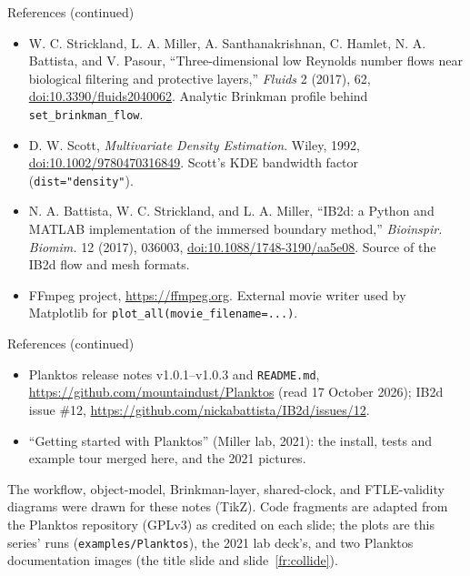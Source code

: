 \documentclass[aspectratio=169,11pt]{beamer}
\begin{document}
\begin{frame}{References (continued)}
\footnotesize
\begin{itemize}\itemsep3pt
  \item W. C. Strickland, L. A. Miller, A. Santhanakrishnan, C. Hamlet, N. A. Battista, and V. Pasour, ``Three-dimensional low Reynolds number flows near biological filtering and protective layers,'' \emph{Fluids} 2 (2017), 62, \href{https://doi.org/10.3390/fluids2040062}{doi:10.3390/fluids2040062}. Analytic Brinkman profile behind \texttt{set\_brinkman\_flow}.
  \item D. W. Scott, \emph{Multivariate Density Estimation}. Wiley, 1992, \href{https://doi.org/10.1002/9780470316849}{doi:10.1002/9780470316849}. Scott's KDE bandwidth factor (\texttt{dist="density"}).
  \item N. A. Battista, W. C. Strickland, and L. A. Miller, ``IB2d: a Python and MATLAB implementation of the immersed boundary method,'' \emph{Bioinspir. Biomim.} 12 (2017), 036003, \href{https://doi.org/10.1088/1748-3190/aa5e08}{doi:10.1088/1748-3190/aa5e08}. Source of the IB2d flow and mesh formats.
  \item FFmpeg project, \url{https://ffmpeg.org}. External movie writer used by Matplotlib for \texttt{plot\_all(movie\_filename=...)}.
\end{itemize}
\end{frame}

\begin{frame}{References (continued)}
\footnotesize
\begin{itemize}\itemsep3pt
  \item Planktos release notes v1.0.1--v1.0.3 and \texttt{README.md}, \url{https://github.com/mountaindust/Planktos} (read 17 October 2026); IB2d issue \#12, \url{https://github.com/nickabattista/IB2d/issues/12}.
  \item ``Getting started with Planktos'' (Miller lab, 2021): the install, tests and example tour merged here, and the 2021 pictures.
\end{itemize}
\begin{punchbox}
\footnotesize The workflow, object-model, Brinkman-layer, shared-clock, and FTLE-validity diagrams were drawn for these notes (TikZ). Code fragments are adapted from the Planktos repository (GPLv3) as credited on each slide; the plots are this series' runs (\texttt{examples/Planktos}), the 2021 lab deck's, and two Planktos documentation images (the title slide and slide~\ref{fr:collide}).
\end{punchbox}
\end{frame}
\end{document}
